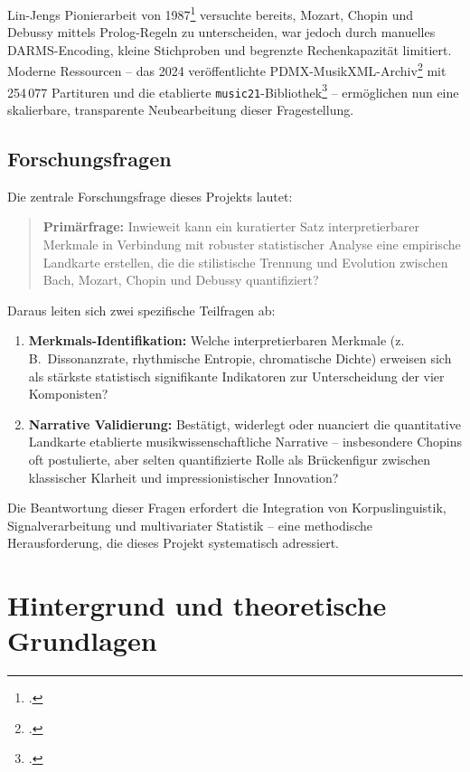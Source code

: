 \documentclass[12pt,a4paper]{article}
\theoremstyle{definition}
\begin{document}
Lin-Jengs Pionierarbeit von 1987\footnote{\cite{LinJeng1987}.} versuchte bereits, Mozart, Chopin und Debussy mittels Prolog-Regeln zu unterscheiden, war jedoch durch manuelles DARMS-Encoding, kleine Stichproben und begrenzte Rechenkapazität limitiert. Moderne Ressourcen -- das 2024 veröffentlichte PDMX-MusikXML-Archiv\footnote{\cite{PDMX2024}.} mit 254\,077 Partituren und die etablierte \texttt{music21}-Bibliothek\footnote{\cite{Cuthbert2010}.} -- ermöglichen nun eine skalierbare, transparente Neubearbeitung dieser Fragestellung.

\subsection{Forschungsfragen}
Die zentrale Forschungsfrage dieses Projekts lautet:

\begin{quote}
    \textbf{Primärfrage:} Inwieweit kann ein kuratierter Satz interpretierbarer Merkmale in Verbindung mit robuster statistischer Analyse eine empirische Landkarte erstellen, die die stilistische Trennung und Evolution zwischen Bach, Mozart, Chopin und Debussy quantifiziert?
\end{quote}

Daraus leiten sich zwei spezifische Teilfragen ab:

\begin{enumerate}
    \item \textbf{Merkmals-Identifikation:} Welche interpretierbaren Merkmale (z.\,B.\ Dissonanzrate, rhythmische Entropie, chromatische Dichte) erweisen sich als stärkste statistisch signifikante Indikatoren zur Unterscheidung der vier Komponisten?
    
    \item \textbf{Narrative Validierung:} Bestätigt, widerlegt oder nuanciert die quantitative Landkarte etablierte musikwissenschaftliche Narrative -- insbesondere Chopins oft postulierte, aber selten quantifizierte Rolle als Brückenfigur zwischen klassischer Klarheit und impressionistischer Innovation?
\end{enumerate}

Die Beantwortung dieser Fragen erfordert die Integration von Korpuslinguistik, Signalverarbeitung und multivariater Statistik -- eine methodische Herausforderung, die dieses Projekt systematisch adressiert.

\section{Hintergrund und theoretische Grundlagen}
\end{document}
